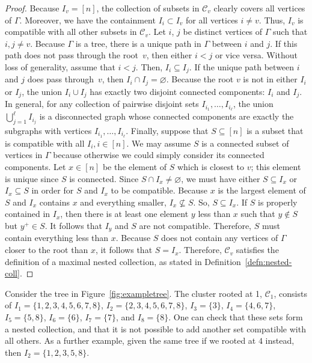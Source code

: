 \documentclass[pdftex]{sigma}
\numberwithin{equation}{section}
\newcommand{\new}[1]{{#1}}
\newcommand{\calC}{\mathcal{C}}
\begin{document}
\begin{proof}
Because $I_v = [n]$, the collection of subsets in $\mathcal{C}_{v}$ clearly covers all vertices of $\Gamma$. Moreover, we have the containment $I_{i} \subset I_{v}$ for all vertices $i \neq v$. Thus, $I_v$ is compatible with all other subsets in $\mathcal{C}_{v}$.
Let $i$, $j$ be distinct vertices of $\Gamma$ such that $i,j \neq v$. Because $\Gamma$ is a tree, there is a unique path in $\Gamma$ between $i$ and $j$. If this path does not pass through the root~$v$, then either $i < j$ or vice versa. Without loss of generality, assume that $i < j$. Then, $I_i \subseteq I_j$. If the unique path between $i$ and $j$ does pass through~$v$, then $I_i \cap I_j = \varnothing$. Because the root $v$ is not in either $I_i$ or $I_j$, the union $I_{i} \cup I_{j}$ has exactly two disjoint connected components: $I_i$ and $I_j$. In general, for any collection of pairwise disjoint sets $I_{i_1}, \dots, I_{i_\ell}$, the union $\bigcup_{j=1}^\ell I_{i_j}$ is a disconnected graph whose connected components are exactly the subgraphs with vertices $I_{i_1}, \dots, I_{i_\ell}$.
Finally, suppose that $S \subseteq [n]$ is a subset that is compatible with all $I_i, i \in [n]$. We may assume $S$ is a connected subset of vertices in $\Gamma$ because otherwise we could simply consider its connected components. Let $x \in [n]$ be the element of $S$ which is closest to $v$; this element is unique since $S$ is connected. Since $S \cap I_x \neq \varnothing$, we must have either $S \subseteq I_x$ or $I_x \subseteq S$ in order for $S$ and $I_x$ to be compatible. Because $x$ is the largest element of $S$ and $I_x$ contains $x$ and everything smaller, $I_x\not\subseteq S$. So, $S \subseteq I_x$. If $S$ is properly contained in $I_x$, then there is at least \new{one} element $y$ less than $x$ such that $y \notin S$ but $y^+ \in S$. It follows that $I_y$ and $S$ are not compatible. Therefore, $S$ must contain everything less than $x$. Because $S$ does not contain any vertices of $\Gamma$ closer to the root than $x$, it follows that $S = I_x$.
Therefore, $\mathcal{C}_{v}$ satisfies the definition of a maximal nested collection, as stated in Defini\-tion~\ref{defn:nested-coll}.
\end{proof}
\begin{Example}\label{ex:rooted-cluster}
Consider the tree in Figure~\ref{fig:exampletree}. The cluster rooted at 1, $\calC_1$, consists of $I_1 = \{1,2,3,4,5,6,7,8\}$, $I_2 = \{2,3,4,5,6,7,8\}$, $I_3 = \{3\}$, $I_4 = \{4,6,7\}$, $I_5 = \{5,8\}$, $I_6 = \{6\}$, $I_7 = \{7\}$, and $I_8 = \{8\}$. One can check that these sets form a nested collection, and that it is not possible to add another set compatible with all others.
As a further example, given the same tree if we rooted at $4$ instead, then $I_2 = \{1,2,3,5,8\}$.
\end{Example}
\end{document}

